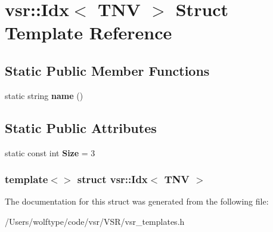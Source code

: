 \hypertarget{structvsr_1_1_idx_3_01_t_n_v_01_4}{\section{vsr\-:\-:Idx$<$ T\-N\-V $>$ Struct Template Reference}
\label{structvsr_1_1_idx_3_01_t_n_v_01_4}
}
\subsection*{Static Public Member Functions}
\begin{DoxyCompactItemize}
\item 
\hypertarget{structvsr_1_1_idx_3_01_t_n_v_01_4_a68b09f49969a9cdc073dcdab5e03a5f4}{static string {\bfseries name} ()}\label{structvsr_1_1_idx_3_01_t_n_v_01_4_a68b09f49969a9cdc073dcdab5e03a5f4}

\end{DoxyCompactItemize}
\subsection*{Static Public Attributes}
\begin{DoxyCompactItemize}
\item 
\hypertarget{structvsr_1_1_idx_3_01_t_n_v_01_4_a1dd24e1b86a02db8666979605c7d059a}{static const int {\bfseries Size} = 3}\label{structvsr_1_1_idx_3_01_t_n_v_01_4_a1dd24e1b86a02db8666979605c7d059a}

\end{DoxyCompactItemize}
\subsubsection*{template$<$$>$ struct vsr\-::\-Idx$<$ T\-N\-V $>$}



The documentation for this struct was generated from the following file\-:\begin{DoxyCompactItemize}
\item 
/\-Users/wolftype/code/vsr/\-V\-S\-R/vsr\-\_\-templates.\-h\end{DoxyCompactItemize}
